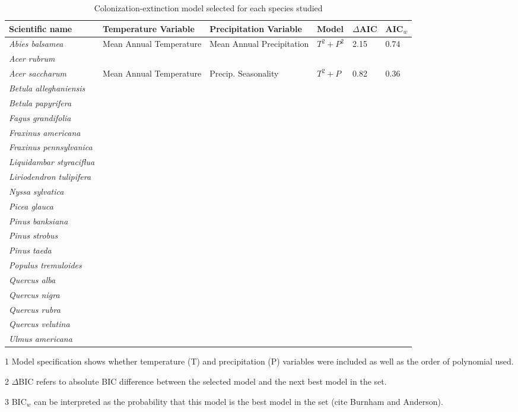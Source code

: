 \begin{table}[tb]
\begin{threeparttable}
\label{tab:model_selection}
\caption{Colonization-extinction model selected for each species studied}
\begin{tabular}{llllll}
\toprule
Scientific name               & Temperature Variable    & Precipitation Variable    & Model\tnote{1} & $\Delta$AIC\tnote{2} & AIC$_w$\tnote{3} \\ 
\midrule
{\it Abies balsamea}          & Mean Annual Temperature & Mean Annual Precipitation & $T^2 + P^2$    & 2.15                 & 0.74             \\
{\it Acer rubrum}             &   &   & & \\
{\it Acer saccharum}          & Mean Annual Temperature & Precip. Seasonality       & $T^2 + P$      & 0.82                 & 0.36             \\
{\it Betula alleghaniensis}   &   &   & & \\
{\it Betula papyrifera}       &   &   & & \\
{\it Fagus grandifolia}       &   &   & & \\
{\it Fraxinus americana}      &   &   & & \\
{\it Fraxinus pennsylvanica}  &   &   & & \\
{\it Liquidambar styraciflua} &   &   & & \\
{\it Liriodendron tulipifera} &   &   & & \\
{\it Nyssa sylvatica}         &   &   & & \\
{\it Picea glauca}            &   &   & & \\
{\it Pinus banksiana}         &   &   & & \\
{\it Pinus strobus}           &   &   & & \\
{\it Pinus taeda}             &   &   & & \\
{\it Populus tremuloides}     &   &   & & \\ 
{\it Quercus alba}            &   &   & & \\
{\it Quercus nigra}           &   &   & & \\
{\it Quercus rubra}           &   &   & & \\
{\it Quercus velutina}        &   &   & & \\
{\it Ulmus americana}         &   &   & & \\ 
\bottomrule
\end{tabular}
\begin{tablenotes}
\item [1] Model specification shows whether temperature (T) and precipitation (P) variables were included as well as the order of polynomial used.
\item [2] $\Delta$BIC refers to absolute BIC difference between the selected model and the next best model in the set.
\item [3] BIC$_w$ can be interpreted as the probability that this model is the best model in the set (cite Burnham and Anderson).
\end{tablenotes}
\end{threeparttable}
\end{table}


